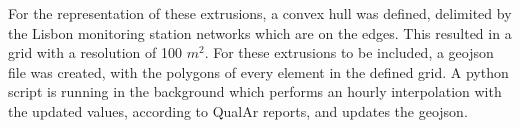 For the representation of these extrusions, a convex hull was defined, delimited by the Lisbon monitoring station networks which are on the edges. This resulted in a grid with a resolution of 100 $m^2$. For these extrusions to be included, a geojson file was created, with the polygons of every element in the defined grid. A python script is running in the background which performs an hourly interpolation with the updated values, according to QualAr reports, and updates the geojson.

